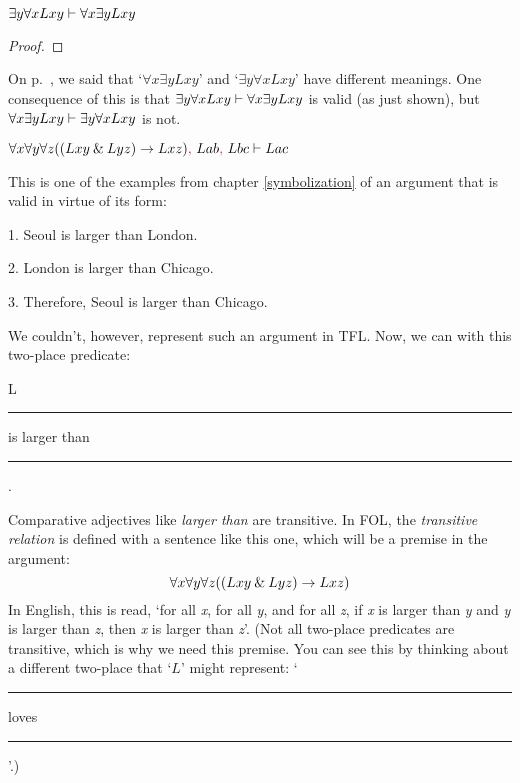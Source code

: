 \begin{earg}
\item $\exists y \forall xLxy \vdash \forall x \exists yLxy$

\begin{proof}
	 \pr{}
	\open
		 \as{}
		 
		 
		 
	\close
	 
\end{proof}
\smallskip
On p.~\pageref{quantifier-order}, we said that `$\forall x \exists yLxy$' and `$\exists y \forall xLxy$' have different meanings. One consequence of this is that $\exists y \forall xLxy \vdash \forall x \exists yLxy$ is valid (as just shown), but $\forall x \exists yLxy \vdash \exists y \forall xLxy$ is not. 
\bigskip

\item $\forall x \forall y \forall z((Lxy \mathbin{\&} Lyz) \rightarrow Lxz)\textcolor{magenta}{,}~ Lab\textcolor{magenta}{,}~ Lbc \vdash Lac$
\end{earg}  %

\noindent\begin{minipage}{0.99\textwidth}
This is one of the examples from chapter \ref{symbolization} of an argument that is valid in virtue of its form:
	\begin{earg}
		\item[1.] Seoul is larger than London.
		\item[2.] London is larger than Chicago.
		\item[3.] Therefore, Seoul is larger than Chicago. 
	\end{earg}
\end{minipage}\bigskip

\noindent We couldn't, however, represent such an argument in TFL. Now, we can with this two-place predicate: 
\begin{ekey}
	\item[L] \rule{1cm}{0.15mm} is larger than \rule{1cm}{0.15mm} .
\end{ekey}
Comparative adjectives like \textit{larger than} are transitive. In FOL, the \textit{transitive relation} is defined with a sentence like this one, which will be a premise in the argument:
$$\forall x \forall y \forall z((Lxy \mathbin{\&} Lyz) \rightarrow Lxz)$$
In English, this is read, `for all \textit{x}, for all \textit{y}, and for all \textit{z}, if \textit{x} is larger than \textit{y} and \textit{y} is larger than \textit{z}, then \textit{x} is larger than \textit{z}'. 
(Not all two-place predicates are transitive, which is why we need this premise. You can see this by thinking about a different two-place that `$L$' might represent: `\rule{1cm}{0.15mm} loves \rule{1cm}{0.15mm}'.)
 
